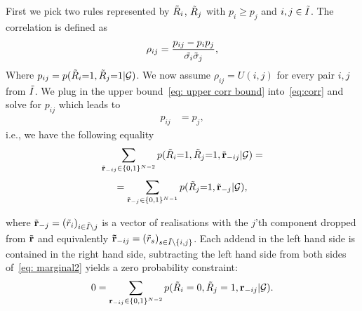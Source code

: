 \documentclass{article}
\theoremstyle{plain}
\theoremstyle{remark}
\newcommand{\vecallrules}{\mathbf{\Tilde{r}}}
\newcommand{\vecallfiredrules}{\mathbf{r}}
\newcommand{\oneruleassignment}{\Tilde{r}}
\newcommand{\onerulRV}{\Tilde{R}}
\newcommand{\alltriples}{\mathcal{G}}
\newcommand{\indexSetAll}{\Tilde{I}}
\begin{document}
First we pick two rules represented by $\onerulRV_i$, $\onerulRV_j$ with $p_i \geq p_j$ and $i,j \in \indexSetAll$. The correlation is defined as
\begin{align}
    \rho_{ij} = \frac{p_{ij} - p_ip_j}{\Tilde{\sigma_i} \Tilde{\sigma}_j} \label{eq:corr},
\end{align}
Where $p_{ij} = p(\onerulRV_i{=}1, \onerulRV_j{=}1 |\alltriples)$. We now assume $\rho_{ij}{=}U(i,j)$ for every pair $i,j$ from $\indexSetAll$. We plug in the upper bound~\eqref{eq: upper corr bound} into~\eqref{eq:corr} and solve for $p_{ij}$ which leads to 
\begin{align}
   p_{ij} &= p_j\label{eq: marginal1},
\end{align}
i.e., we have the following equality
\begin{align*}
   \sum_{\Tilde{\vecallfiredrules}_{-ij} \in \{0, 1\}^{N-2}}p(\onerulRV_i{=}1, \onerulRV_j{=}1, \Tilde{\vecallfiredrules}_{-ij} | \alltriples) = 
\end{align*}
\begin{align}
   =\sum_{\Tilde{\vecallfiredrules}_{-j} \in \{0, 1\}^{N-1}}p(\onerulRV_j{=}1, \Tilde{\vecallfiredrules}_{-j} | \alltriples) \label{eq: marginal2},
\end{align}

\noindent where $\Tilde{\vecallfiredrules}_{-j}= (\oneruleassignment_i)_{i \in \indexSetAll \setminus j}$ is a vector of realisations with the $j$'th component dropped from $\Tilde{\vecallfiredrules}$ and 
equivalently $\vecallrules_{-ij}= (\oneruleassignment_s)_{s \in \indexSetAll  \setminus \{i,j\}}$.
Each addend in the left hand side is contained in the right hand side, subtracting the left hand side from both sides of~\eqref{eq: marginal2} yields a zero probability constraint:
\begin{align}
   0=\sum_{\vecallfiredrules_{-ij} \in \{0, 1\}^{N-2}}p(\onerulRV_i=0, \onerulRV_j=1, \vecallfiredrules_{-ij} | \alltriples) \label{eq: marginal-zero-constraint}.
\end{align}

\end{document}
